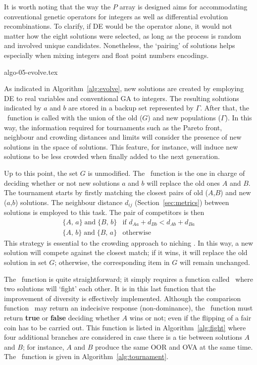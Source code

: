 \documentclass[final,5p,times,twocolumn]{elsarticle}
\begin{document}
It is worth noting that the way the $P$ array is designed aims for accommodating conventional
genetic operators for integers as well as differential evolution recombinations. To clarify, if DE
would be the operator alone, it would not matter how the eight solutions were selected, as long as
the process is random and involved unique candidates. Nonetheless, the `pairing' of solutions helps
especially when mixing integers and float point numbers encodings.


{algo-05-evolve.tex}


As indicated in Algorithm~\ref{alg:evolve}, new solutions are created by employing DE to real
variables and conventional GA to integers. The resulting solutions indicated by $a$ and $b$ are
stored in a backup set represented by $\Gamma$. After that, the \FnMetrics~function is called with
the union of the old ($G$) and new populations ($\Gamma$). In this way, the information required for
tournaments such as the Pareto front, neighbour and crowding distances and limits will consider the
presence of new solutions in the space of solutions. This feature, for instance, will induce new
solutions to be less crowded when finally added to the next generation.

Up to this point, the set $G$ is unmodified. The \FnTournament~function is the one in charge of
deciding whether or not new solutions $a$ and $b$ will replace the old ones $A$ and $B$. The
tournament starts by firstly matching the closest pairs of old ($A$,$B$) and new ($a$,$b$)
solutions. The neighbour distance $d_{ij}$ (Section~\ref{sec:metrics}) between solutions is employed
to this task. The pair of competitors is then
\begin{equation}
    \begin{matrix}
        \{A,\,a\}\;\text{and}\;\{B,\,b\} & \text{if $d_{Aa}+d_{Bb} < d_{Ab}+d_{Ba}$} \\
        \{A,\,b\}\;\text{and}\;\{B,\,a\} & \text{otherwise}
    \end{matrix}
\label{eqn:competitors}
\end{equation}
This strategy is essential to the crowding approach to niching \citep{meng:08}. In this way, a new
solution will compete against the closest match; if it wins, it will replace the old solution in set
$G$; otherwise, the corresponding item in $G$ will remain unchanged.

The \FnTournament~function is quite straightforward; it simply requires a function called
\FnFight~where two solutions will `fight' each other. It is in this last function that the
improvement of diversity is effectively implemented. Although the comparison function
\FnCompareSolutions~may return an indecisive response (non-dominance), the \FnFight~function must
return {\bf true} or {\bf false} deciding whether $A$ wins or not; even if the flipping of a fair
coin has to be carried out. This function is listed in Algorithm~\ref{alg:fight} where four
additional branches are considered in case there is a tie between solutions $A$ and $B$; for
instance, $A$ and $B$ produce the same OOR and OVA at the same time. The \FnTournament~function is
given in Algorithm~\ref{alg:tournament}.
\end{document}
